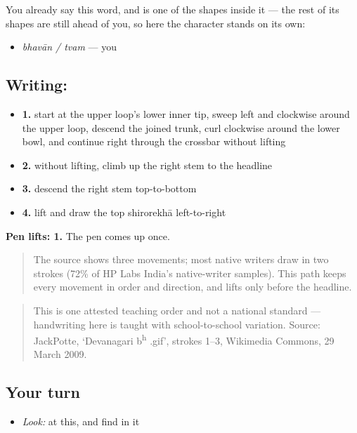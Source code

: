 You already say this word, and  is one of the shapes inside it — the rest of its shapes are still ahead of you, so here the character stands on its own:

\begin{itemize}
\raggedright
  \item \emph{bhavān / tvam} — you
\end{itemize}

\subsection*{Writing: }

\begin{itemize}
\raggedright
  \item \textbf{1.} start at the upper loop's lower inner tip, sweep left and clockwise around the upper loop, descend the joined trunk, curl clockwise around the lower bowl, and continue right through the crossbar without lifting
  \item \textbf{2.} without lifting, climb up the right stem to the headline
  \item \textbf{3.} descend the right stem top-to-bottom
  \item \textbf{4.} lift and draw the top shirorekhā left-to-right
\end{itemize}

\textbf{Pen lifts: 1.} The pen comes up once.

\begin{quote}
The source shows three movements; most native writers draw  in two strokes (72\% of HP Labs India's native-writer samples). This path keeps every movement in order and direction, and lifts only before the headline.
\end{quote}

\begin{quote}
This is one attested teaching order and not a national standard — handwriting here is taught with school-to-school variation. Source: JackPotte, ‘Devanagari b\textsuperscript{h} .gif’, strokes 1–3, Wikimedia Commons, 29 March 2009.
\end{quote}

\subsection*{Your turn}
\begin{itemize}
\raggedright
  \item \emph{Look:} at this, and find  in it
\end{itemize}

